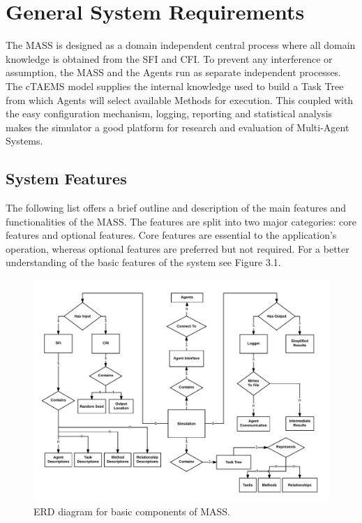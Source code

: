 \chapter{General System Requirements}\label{systemRequirements}

The MASS is designed as a domain independent central process where all domain knowledge is obtained from the SFI and CFI. To prevent any interference or assumption, the MASS and the Agents run as separate independent processes. The cTAEMS model supplies the internal knowledge used to build a Task Tree from which Agents will select available Methods for execution. This coupled with the easy configuration mechanism, logging, reporting and statistical analysis makes the simulator a good platform for research and evaluation of Multi-Agent Systems.

\section{System Features}

The following list offers a brief outline and description of the main features and functionalities of the MASS. The features are split into two major categories: core features and optional features. Core features are essential to the application's operation, whereas optional features are preferred but not required. For a better understanding of the basic features of the system see Figure 3.1.

\begin{figure}[H]
\centering
\includegraphics[width=6.5in]{figs/ERD.pdf}
\caption{ERD diagram for basic components of MASS.}
\label{fig:ERD }
\end{figure}

